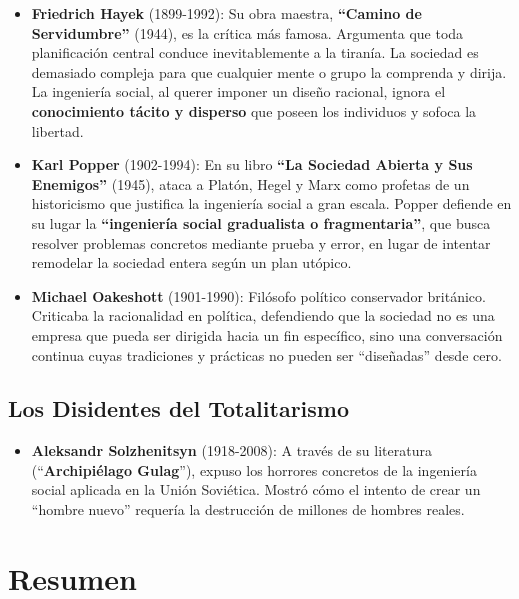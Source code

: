 \documentclass[
  letterpaper,
  DIV=11,
  numbers=noendperiod]{scrreprt}
\providecommand{\tightlist}{%
  \setlength{\itemsep}{0pt}\setlength{\parskip}{0pt}}\usepackage{longtable,booktabs,array}
\begin{document}
\begin{itemize}
\tightlist
\item
  \textbf{Friedrich Hayek} (1899-1992): Su obra maestra,
  \textbf{``Camino de Servidumbre''} (1944), es la crítica más famosa.
  Argumenta que toda planificación central conduce inevitablemente a la
  tiranía. La sociedad es demasiado compleja para que cualquier mente o
  grupo la comprenda y dirija. La ingeniería social, al querer imponer
  un diseño racional, ignora el \textbf{conocimiento tácito y disperso}
  que poseen los individuos y sofoca la libertad.
\item
  \textbf{Karl Popper} (1902-1994): En su libro \textbf{``La Sociedad
  Abierta y Sus Enemigos''} (1945), ataca a Platón, Hegel y Marx como
  profetas de un historicismo que justifica la ingeniería social a gran
  escala. Popper defiende en su lugar la \textbf{``ingeniería social
  gradualista o fragmentaria''}, que busca resolver problemas concretos
  mediante prueba y error, en lugar de intentar remodelar la sociedad
  entera según un plan utópico.
\item
  \textbf{Michael Oakeshott} (1901-1990): Filósofo político conservador
  británico. Criticaba la racionalidad en política, defendiendo que la
  sociedad no es una empresa que pueda ser dirigida hacia un fin
  específico, sino una conversación continua cuyas tradiciones y
  prácticas no pueden ser ``diseñadas'' desde cero.
\end{itemize}

\subsection{Los Disidentes del
Totalitarismo}\label{los-disidentes-del-totalitarismo}

\begin{itemize}
\tightlist
\item
  \textbf{Aleksandr Solzhenitsyn} (1918-2008): A través de su literatura
  (``\textbf{Archipiélago Gulag}''), expuso los horrores concretos de la
  ingeniería social aplicada en la Unión Soviética. Mostró cómo el
  intento de crear un ``hombre nuevo'' requería la destrucción de
  millones de hombres reales.
\end{itemize}

\section{Resumen}\label{resumen}
\end{document}
